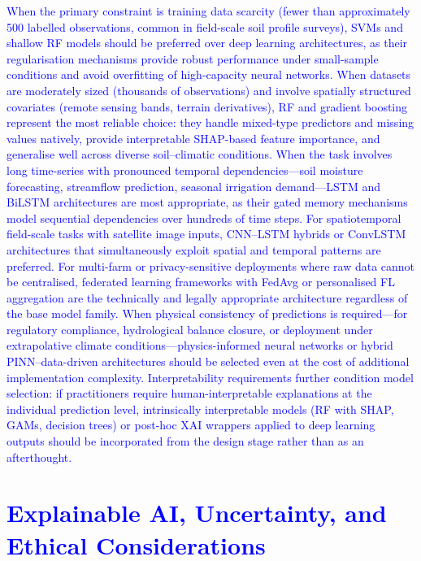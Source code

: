 \documentclass[land,article,submit,pdftex,moreauthors]{Definitions/mdpi}
\numberwithin{equation}{section}
\begin{document}
\textcolor{blue}{When the primary constraint is training data scarcity (fewer than approximately 500 labelled observations, common in field-scale soil profile surveys), SVMs and shallow RF models should be preferred over deep learning architectures, as their regularisation mechanisms provide robust performance under small-sample conditions and avoid overfitting of high-capacity neural networks. When datasets are moderately sized (thousands of observations) and involve spatially structured covariates (remote sensing bands, terrain derivatives), RF and gradient boosting represent the most reliable choice: they handle mixed-type predictors and missing values natively, provide interpretable SHAP-based feature importance, and generalise well across diverse soil--climatic conditions. When the task involves long time-series with pronounced temporal dependencies---soil moisture forecasting, streamflow prediction, seasonal irrigation demand---LSTM and BiLSTM architectures are most appropriate, as their gated memory mechanisms model sequential dependencies over hundreds of time steps. For spatiotemporal field-scale tasks with satellite image inputs, CNN--LSTM hybrids or ConvLSTM architectures that simultaneously exploit spatial and temporal patterns are preferred. For multi-farm or privacy-sensitive deployments where raw data cannot be centralised, federated learning frameworks with FedAvg or personalised FL aggregation are the technically and legally appropriate architecture regardless of the base model family. When physical consistency of predictions is required---for regulatory compliance, hydrological balance closure, or deployment under extrapolative climate conditions---physics-informed neural networks or hybrid PINN--data-driven architectures should be selected even at the cost of additional implementation complexity. Interpretability requirements further condition model selection: if practitioners require human-interpretable explanations at the individual prediction level, intrinsically interpretable models (RF with SHAP, GAMs, decision trees) or post-hoc XAI wrappers applied to deep learning outputs should be incorporated from the design stage rather than as an afterthought.}


\section{\textcolor{blue}{Explainable AI, Uncertainty, and Ethical Considerations}}
\end{document}
